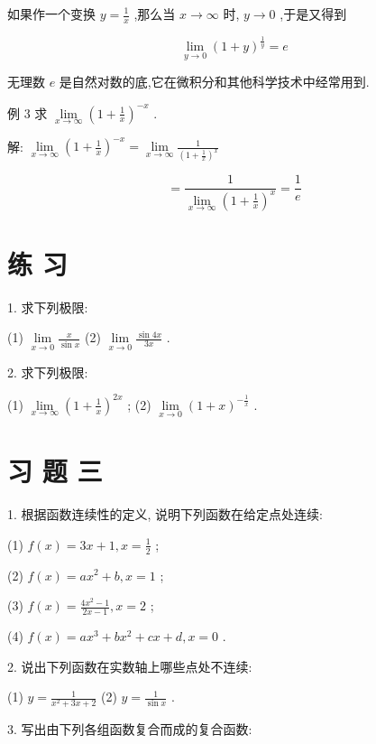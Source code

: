 \documentclass[10pt]{article}
\begin{document}
如果作一个变换 \(y = \frac{1}{x}\) ,那么当 \(x \rightarrow \infty\) 时, \(y \rightarrow 0\) ,于是又得到

\[
\mathop{\lim }\limits_{{y \rightarrow 0}}{\left( 1 + y\right) }^{\frac{1}{y}} = e
\]

无理数 \(e\) 是自然对数的底,它在微积分和其他科学技术中经常用到.

例 3 求 \(\mathop{\lim }\limits_{{x \rightarrow \infty }}{\left( 1 + \frac{1}{x}\right) }^{-x}\) .

解: \(\mathop{\lim }\limits_{{x \rightarrow \infty }}{\left( 1 + \frac{1}{x}\right) }^{-x} = \mathop{\lim }\limits_{{x \rightarrow \infty }}\frac{1}{{\left( 1 + \frac{1}{x}\right) }^{x}}\)

\[
= \frac{1}{\mathop{\lim }\limits_{{x \rightarrow \infty }}{\left( 1 + \frac{1}{x}\right) }^{x}} = \frac{1}{e}
\]

\section*{练 习}

1. 求下列极限:

(1) \(\mathop{\lim }\limits_{{x \rightarrow 0}}\frac{x}{\sin x}\) (2) \(\mathop{\lim }\limits_{{x \rightarrow 0}}\frac{\sin {4x}}{3x}\) .

2. 求下列极限:

(1) \(\mathop{\lim }\limits_{{x \rightarrow \infty }}{\left( 1 + \frac{1}{x}\right) }^{2x}\) ; (2) \(\mathop{\lim }\limits_{{x \rightarrow 0}}{\left( 1 + x\right) }^{-\frac{1}{x}}\) .

\section*{习 题 三}

1. 根据函数连续性的定义, 说明下列函数在给定点处连续:

(1) \(f\left( x\right) = {3x} + 1,x = \frac{1}{2}\) ;

(2) \(f\left( x\right) = a{x}^{2} + b,x = 1\) ;

(3) \(f\left( x\right) = \frac{4{x}^{2} - 1}{{2x} - 1},x = 2\) ;

(4) \(f\left( x\right) = a{x}^{3} + b{x}^{2} + {cx} + d,x = 0\) .

2. 说出下列函数在实数轴上哪些点处不连续:

(1) \(y = \frac{1}{{x}^{2} + {3x} + 2}\) (2) \(y = \frac{1}{\sin x}\) .

3. 写出由下列各组函数复合而成的复合函数:
\end{document}
